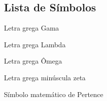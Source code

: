 \begin{landscape}
\begin{minipage}[t]{0.42\textwidth}
    \section*{Lista de Símbolos}
    \begin{SingleSpace}
    \begin{description}
        \setlength{\itemsep}{-2pt} %
        \item[$ \Gamma $] Letra grega Gama
        \item[$ \Lambda $] Letra grega Lambda
        \item[$ \Omega $] Letra grega Ômega
        \item[$ \zeta $] Letra grega minúscula zeta
        \item[$ \in $] Símbolo matemático de Pertence
    \end{description}
    \end{SingleSpace}
\end{minipage}

\end{landscape}